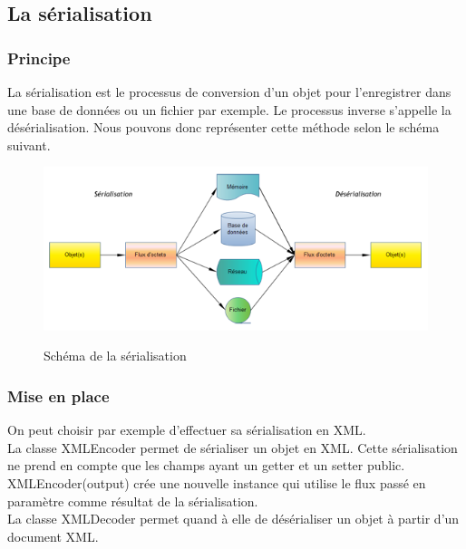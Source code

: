 \subsection{La sérialisation}

\subsubsection{Principe}

La sérialisation est le processus de conversion d'un objet pour l'enregistrer dans une base de données ou un fichier par exemple. Le processus inverse s'appelle la désérialisation. Nous pouvons donc représenter cette méthode selon le schéma suivant. 

\begin{figure}[!h]
  \center
  \includegraphics[scale=0.5]{../graph/serialisation.png} \\
  \caption{Schéma de la sérialisation}
\end{figure}

\subsubsection{Mise en place}
On peut choisir par exemple d'effectuer sa sérialisation en XML. \\

La classe XMLEncoder permet de sérialiser un objet en XML. Cette sérialisation ne prend en compte que les champs ayant un getter et un setter public. XMLEncoder(output) crée une nouvelle instance qui utilise le flux passé en paramètre comme résultat de la sérialisation. \\

La classe XMLDecoder permet quand à elle de désérialiser un objet à partir d'un document XML. \\

